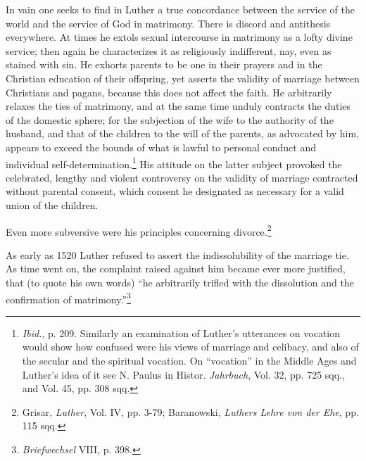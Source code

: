 In vain one seeks to find in Luther a true concordance between the
service of the world and the service of God in matrimony. There is
discord and antithesis everywhere. At times he extols sexual intercourse
in matrimony as a lofty divine service; then again he characterizes it
as religiously indifferent, nay, even as stained with sin. He exhorts
parents to be one in their prayers and in the Christian education
of their offspring, yet asserts the validity of marriage between Christians
and pagans, because this does not affect the faith. He arbitrarily
relaxes the ties of matrimony, and at the same time unduly contracts
the duties of the domestic sphere; for the subjection of the wife to
the authority of the husband, and that of the children to the will of
the parents, as advocated by him, appears to exceed the bounds of
what is lawful to personal conduct and individual self-determination.\footnote
{\textit{Ibid.}, p. 209. Similarly an examination of Luther’s utterances on vocation would
show how confused were his views of marriage and celibacy, and also of the secular and
the spiritual vocation. On “vocation” in the Middle Ages and Luther’s idea of it see
N. Paulus in Histor. \textit{Jahrbuch}, Vol. 32, pp. 725 sqq., and Vol. 45, pp. 308 sqq.}
His attitude on the latter subject provoked the celebrated,
lengthy and violent controversy on the validity of marriage contracted
without parental consent, which consent he designated as
necessary for a valid union of the children.

Even more subversive were his principles concerning divorce.\footnote
{Grisar, \textit{Luther}, Vol. IV, pp. 3-79; Baranowski, \textit{Luthers Lehre von der Ehe}, pp. 115 sqq.}

As early as 1520 Luther refused to assert the indissolubility of the
marriage tie. As time went on, the complaint raised against him became
ever more justified, that (to quote his own words) “he arbitrarily trifled
with the dissolution and the confirmation of matrimony.”\footnote{\textit{Briefwechsel} VIII, p. 398.}

